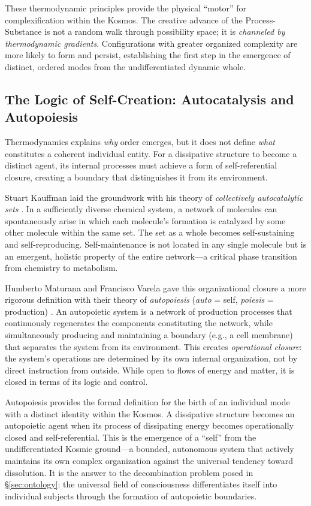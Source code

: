 \documentclass[12pt,a4paper]{article}
\begin{document}
These thermodynamic principles provide the physical ``motor'' for
complexification within the Kosmos.  The creative advance of the
Process-Substance is not a random walk through possibility space; it is
\emph{channeled by thermodynamic gradients}.  Configurations with greater
organized complexity are more likely to form and persist, establishing the
first step in the emergence of distinct, ordered modes from the
undifferentiated dynamic whole.

\subsection{The Logic of Self-Creation: Autocatalysis and Autopoiesis}
\label{sec:autopoiesis}

Thermodynamics explains \emph{why} order emerges, but it does not define
\emph{what} constitutes a coherent individual entity.  For a dissipative
structure to become a distinct agent, its internal processes must achieve a
form of self-referential closure, creating a boundary that distinguishes it
from its environment.

Stuart Kauffman laid the groundwork with his theory of \emph{collectively
autocatalytic sets} \citep{kauffman1993,kauffman1995}.  In a sufficiently
diverse chemical system, a network of molecules can spontaneously arise in
which each molecule's formation is catalyzed by some other molecule within
the same set.  The set as a whole becomes self-sustaining and
self-reproducing.  Self-maintenance is not located in any single molecule
but is an emergent, holistic property of the entire network---a critical
phase transition from chemistry to metabolism.

Humberto Maturana and Francisco Varela gave this organizational closure a
more rigorous definition with their theory of \emph{autopoiesis}
(\emph{auto} = self, \emph{poiesis} = production) \citep{maturana1980}.
An autopoietic system is a network of production processes that
continuously regenerates the components constituting the network, while
simultaneously producing and maintaining a boundary (e.g., a cell
membrane) that separates the system from its environment.  This creates
\emph{operational closure}: the system's operations are determined by its
own internal organization, not by direct instruction from outside.  While
open to flows of energy and matter, it is closed in terms of its logic and
control.

Autopoiesis provides the formal definition for the birth of an individual
mode with a distinct identity within the Kosmos.  A dissipative structure
becomes an autopoietic agent when its process of dissipating energy becomes
operationally closed and self-referential.  This is the emergence of a
``self'' from the undifferentiated Kosmic ground---a bounded, autonomous
system that actively maintains its own complex organization against the
universal tendency toward dissolution.  It is the answer to the
decombination problem posed in \S\ref{sec:ontology}: the universal field of
consciousness differentiates itself into individual subjects through the
formation of autopoietic boundaries.
\end{document}
